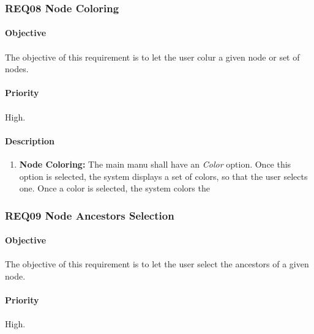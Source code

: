 \documentclass[10pt,a4paper]{article}
\begin{document}
  \subsubsection{REQ08 Node Coloring}
\paragraph{Objective}
\paragraph{}
The objective of this requirement is to let the user colur a given node or set of nodes.
\paragraph{Priority}
\paragraph{}
High.
\paragraph{Description}
  \begin{enumerate}
    \item \textbf{Node Coloring: }
	The main manu shall have an \emph{Color} option. Once this option is selected, the system displays a set of colors, so that the user selects one. Once a color is selected, the system colors the 
    \end{enumerate}

  \subsubsection{REQ09 Node Ancestors Selection}
\paragraph{Objective}
\paragraph{}
The objective of this requirement is to let the user select the ancestors of a given node.

\paragraph{Priority}
\paragraph{}
High.
\end{document}
